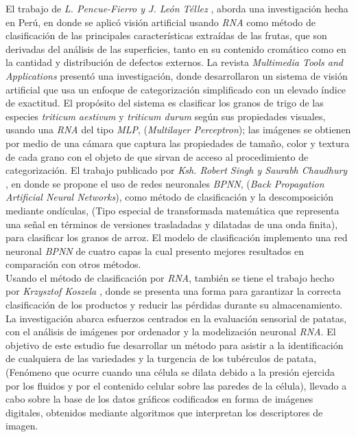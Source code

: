 El trabajo de \textit{L. Pencue-Fierro y J. León Téllez} \cite{article2}, aborda una investigación hecha en Perú, en donde se aplicó visión artificial usando \textit{RNA} como método de clasificación de las principales características extraídas de las frutas, que son derivadas del análisis de las superficies, tanto en su contenido cromático como en la cantidad y distribución de defectos externos. La revista \textit{Multimedia Tools and Applications} \cite{Shrivastava2017} presentó una investigación, donde desarrollaron un sistema de visión artificial que usa un enfoque de categorización simplificado con un elevado índice de exactitud. El propósito del sistema es clasificar los granos de trigo de las especies \textit{triticum aestivum} y \textit{triticum durum} según sus propiedades visuales, usando una \textit{RNA} del tipo \textit{MLP}, (\textit{Multilayer Perceptron}); las imágenes se obtienen por medio de una cámara que captura las propiedades de tamaño, color y textura de cada grano con el objeto de que sirvan de acceso al procedimiento de categorización. El trabajo publicado por \textit{Ksh. Robert Singh y Saurabh Chaudhury} \cite{Singh2016}, en donde se propone el uso de redes neuronales \textit{BPNN}, (\textit{Back Propagation Artificial Neural Networks}), como método de clasificación y la descomposición mediante ondículas, (Tipo especial de transformada matemática que representa una señal en términos de versiones trasladadas y dilatadas de una onda finita), para clasificar los granos de arroz. El modelo de clasificación implemento una red neuronal \textit{BPNN} de cuatro capas la cual presento mejores resultados en comparación con otros métodos.\\

Usando el método de clasificación por \textit{RNA}, también se tiene el trabajo hecho por \textit{Krzysztof Koszela} \cite{Przybyl2019}, donde se presenta una forma para garantizar la correcta clasificación de los productos y reducir las pérdidas durante su almacenamiento. La investigación abarca esfuerzos centrados en la evaluación sensorial de patatas, con el análisis de imágenes por ordenador y la modelización neuronal \textit{RNA}. El objetivo de este estudio fue desarrollar un método para asistir a la identificación de cualquiera de las variedades y la turgencia de los tubérculos de patata, (Fenómeno que ocurre cuando una célula se dilata debido a la presión ejercida por los fluidos y por el contenido celular sobre las paredes de la célula), llevado a cabo sobre la base de los datos gráficos codificados en forma de imágenes digitales, obtenidos mediante algoritmos que interpretan los descriptores de imagen.\\

